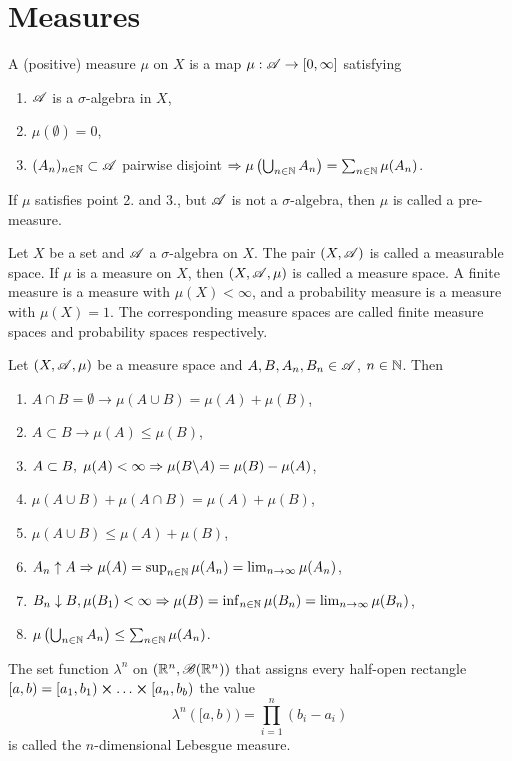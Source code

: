 \section{Measures}

\begin{definition}
    A (positive) measure $\mu$ on $X$ is a map $\mu:\mathscr{A}\rightarrow [0,\infty]$ satisfying
    \begin{enumerate}
        \item $\mathscr{A}$ is a $\sigma$-algebra in $X$,
        \item $\mu(\emptyset)=0$,
        \item $(A_n)_{n\in\mathbb{N}}\subset \mathscr{A}$ pairwise disjoint $\Rightarrow \mu\left(\bigcup_{n\in\mathbb{N}} A_n\right) = \sum_{n\in\mathbb{N}}\mu(A_n)$.
    \end{enumerate}
    If $\mu$ satisfies point 2. and 3., but $\mathscr{A}$ is not a $\sigma$-algebra, then $\mu$ is called a pre-measure. 
\end{definition}

\begin{definition}
    Let $X$ be a set and $\mathscr{A}$ a $\sigma$-algebra on $X$. The pair $(X,\mathscr{A})$ is called a measurable space. If $\mu$ is a measure on $X$, then $(X,\mathscr{A},\mu)$ is called a measure space.
    A finite measure is a measure with $\mu(X)<\infty$, and a probability measure is a measure with $\mu(X)=1$. The corresponding measure spaces are called finite measure spaces and probability spaces respectively.

\end{definition}

\begin{proposition}
    Let $(X,\mathscr{A},\mu)$ be a measure space and $A,B,A_n,B_n\in\mathscr{A}$, $n\in\mathbb{N}$. Then 
    \begin{enumerate}
        \item $A\cap B=\emptyset \rightarrow \mu(A\cup B)=\mu(A)+\mu(B)$,
        \item $A\subset B \rightarrow \mu(A)\leq\mu(B)$,
        \item $A\subset B,\hspace{1mm} \mu(A)<\infty \Rightarrow \mu(B\backslash A)=\mu(B)-\mu(A)$,
        \item  $\mu(A\cup B) + \mu(A\cap B)=\mu(A)+\mu(B)$,
        \item $\mu(A\cup B)\leq \mu(A)+\mu(B)$,
        \item $A_n\uparrow A\Rightarrow \mu(A)=\sup_{n\in\mathbb{N}}\mu(A_n)=\lim_{n\rightarrow\infty}\mu(A_n)$,
        \item $B_n\downarrow B,\mu(B_1)<\infty\Rightarrow \mu(B)=\inf_{n\in\mathbb{N}}\mu(B_n)=\lim_{n\rightarrow\infty}\mu(B_n)$,
        \item $\mu\left(\bigcup_{n\in\mathbb{N}}A_n\right)\leq \sum_{n\in\mathbb{N}}\mu(A_n)$.
    \end{enumerate}
\end{proposition}

\begin{definition}
    The set function $\lambda^n$ on $(\mathbb{R}^n,\mathscr{B}(\mathbb{R}^n))$ that assigns every half-open rectangle $[a,b)=[a_1,b_1)\cross\ldots\cross[a_n,b_b)$ the value
    $$\lambda^n([a,b)) = \prod_{i=1}^{n}(b_i-a_i)$$
    is called the $n$-dimensional Lebesgue measure. 
\end{definition}